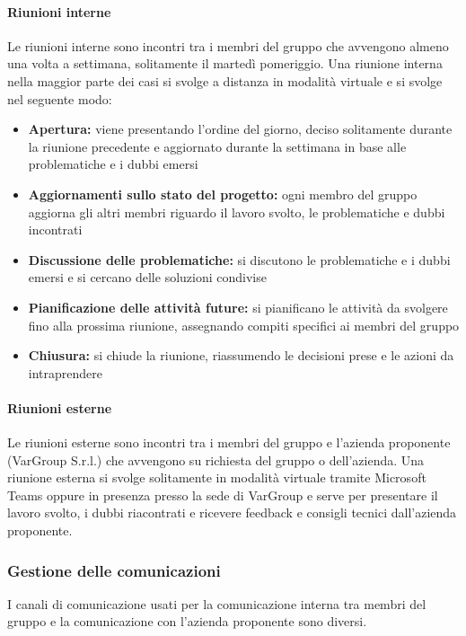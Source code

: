 \documentclass[a4paper, 11pt]{article}
\begin{document}
\paragraph{Riunioni interne}
Le riunioni interne sono incontri tra i membri del gruppo che avvengono almeno una volta a settimana, solitamente il martedì pomeriggio. 
Una riunione interna nella maggior parte dei casi si svolge a distanza in modalità virtuale e si svolge nel seguente modo:
\begin{itemize}
    \item \textbf{Apertura:} viene presentando l'ordine del giorno, deciso solitamente durante la riunione precedente e aggiornato durante la settimana in base alle problematiche e i dubbi emersi
    \item \textbf{Aggiornamenti sullo stato del progetto:} ogni membro del gruppo aggiorna gli altri membri riguardo il lavoro svolto, le problematiche e dubbi incontrati
    \item \textbf{Discussione delle problematiche:} si discutono le problematiche e i dubbi emersi e si cercano delle soluzioni condivise
    \item \textbf{Pianificazione delle attività future:} si pianificano le attività da svolgere fino alla prossima riunione, assegnando compiti specifici ai membri del gruppo
    \item \textbf{Chiusura:} si chiude la riunione, riassumendo le decisioni prese e le azioni da intraprendere
\end{itemize}
\paragraph{Riunioni esterne}
Le riunioni esterne sono incontri tra i membri del gruppo e l'azienda proponente (VarGroup S.r.l.) che avvengono su richiesta del gruppo o dell'azienda.
Una riunione esterna si svolge solitamente in modalità virtuale tramite Microsoft Teams oppure in presenza presso la sede di VarGroup e serve per presentare il lavoro svolto, i dubbi riacontrati e ricevere feedback e consigli tecnici dall'azienda proponente.

\subsubsection{Gestione delle comunicazioni}
I canali di comunicazione usati per la comunicazione interna tra membri del gruppo e la comunicazione con l'azienda proponente sono diversi.
\end{document}

